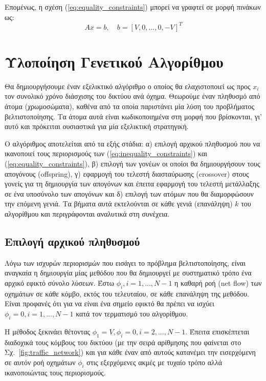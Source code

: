 \documentclass[a4paper,12pt]{article}
\begin{document}
Επομένως, η σχέση (\ref{eq:equality_constraints}) μπορεί να γραφτεί σε μορφή πινάκων ως:
\begin{equation}
    A x = b, \quad b = [V,0,...,0,-V]^T
    \label{eq:equality_constraints_matrix_form}
\end{equation}

\newpage

\section{Υλοποίηση Γενετικού Αλγορίθμου}

Θα δημιουργήσουμε έναν εξελικτικό αλγόριθμο ο οποίος θα ελαχιστοποιεί ως προς $x_i$ τον συνολικό χρόνο διάσχισης 
του δικτύου ανά όχημα. Θεωρούμε έναν πληθυσμό από άτομα (χρωμοσώματα), καθένα από τα οποία παριστάνει μία λύση του
προβλήματος βελτιστοποίησης. Τα άτομα αυτά είναι κωδικοποιημένα στη μορφή που βρίσκονται, γι' αυτό και πρόκειται 
ουσιαστικά για μία εξελικτική στρατηγική. 

Ο αλγόριθμος αποτελείται από τα εξής στάδια: 
α) επιλογή αρχικού πληθυσμού που να ικανοποιεί τους περιορισμούς των (\ref{eq:inequality_constraints}) και 
(\ref{eq:equality_constraints}),
β) επιλογή των γονέων οι οποίοι θα δημιουργήσουν τους απογόνους
(offspring),
γ) εφαρμογή του τελεστή διασταύρωσης (crossover) στους γονείς 
για τη δημιουργία των απογόνων και έπειτα εφαρμογή του τελεστή μετάλλαξης σε ένα υποσύνολο των απογόνων και
δ) επιλογή των ατόμων που θα διαμορφώσουν την επόμενη γενιά. 
Τα βήματα αυτά εκτελούνται σε κάθε γενιά (επανάληψη) $k$ του αλγορίθμου και περιγράφονται αναλυτικά στη συνέχεια.

\subsection{Επιλογή αρχικού πληθυσμού}
Λόγω των ισχυρών περιορισμών που εισάγει το πρόβλημα βελτιστοποίησης, είναι αναγκαία η δημιουργία μίας μεθόδου
που θα δημιουργεί με συστηματικό τρόπο ένα αρχικό εφικτό σύνολο λύσεων. Έστω $\phi_i, i=1,...,N-1$ η καθαρή ροή 
(net flow) των οχημάτων σε κάθε κόμβο, εκτός του τελευταίου, 
σε κάθε επανάληψη της μεθόδου. Είναι προφανές ότι για να είναι ένα σημείο εφικτό θα πρέπει να ισχύει 
$\phi_i = 0, i=1,...,N-1$ κατά τον τερματισμό του αλγορίθμου.

Η μέθοδος ξεκινάει θέτοντας $\phi_1 = V, \phi_i = 0, i=2,...,N-1$. Έπειτα επισκέπτεται διαδοχικά 
τους κόμβους του δικτύου (με την σειρά αρίθμησης που φαίνεται στο Σχ.~\ref{fig:traffic_network}) και για κάθε έναν
από αυτούς κατανέμει την εισερχόμενη σε αυτόν ροή οχημάτων $\phi_i$ στις εξερχόμενες ακμές με τυχαίο τρόπο αλλά 
ικανοποιώντας τους περιορισμούς. 
\end{document}
